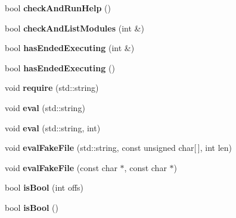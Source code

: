\begin{DoxyCompactItemize}
\item 
bool {\bfseries check\+And\+Run\+Help} ()\hypertarget{class_ice_tea_a8c9f95b6fcbc44b5e284d1d9686e74d7}{}\label{class_ice_tea_a8c9f95b6fcbc44b5e284d1d9686e74d7}

\item 
bool {\bfseries check\+And\+List\+Modules} (int \&)\hypertarget{class_ice_tea_aa48b4eb574e6f3ca9d21fc0c768c72b7}{}\label{class_ice_tea_aa48b4eb574e6f3ca9d21fc0c768c72b7}

\item 
bool {\bfseries has\+Ended\+Executing} (int \&)\hypertarget{class_ice_tea_a70d45477cad3081fb170740420e4f39c}{}\label{class_ice_tea_a70d45477cad3081fb170740420e4f39c}

\item 
bool {\bfseries has\+Ended\+Executing} ()\hypertarget{class_ice_tea_a4dc088d15d98924c132af9bba3c33101}{}\label{class_ice_tea_a4dc088d15d98924c132af9bba3c33101}

\item 
void {\bfseries require} (std\+::string)\hypertarget{class_ice_tea_a5b8cc8e876017e74fb721c55ca5d2179}{}\label{class_ice_tea_a5b8cc8e876017e74fb721c55ca5d2179}

\item 
void {\bfseries eval} (std\+::string)\hypertarget{class_ice_tea_a7f2594854e6110af44a1fa36335ae340}{}\label{class_ice_tea_a7f2594854e6110af44a1fa36335ae340}

\item 
void {\bfseries eval} (std\+::string, int)\hypertarget{class_ice_tea_ab11c20fe80d3cff0a4b96c2f10d20f28}{}\label{class_ice_tea_ab11c20fe80d3cff0a4b96c2f10d20f28}

\item 
void {\bfseries eval\+Fake\+File} (std\+::string, const unsigned char\mbox{[}$\,$\mbox{]}, int len)\hypertarget{class_ice_tea_a227da36c5c8de45b19d430c8d2126f02}{}\label{class_ice_tea_a227da36c5c8de45b19d430c8d2126f02}

\item 
void {\bfseries eval\+Fake\+File} (const char $\ast$, const char $\ast$)\hypertarget{class_ice_tea_a289840c34e37295ae8f454e9e41bca8b}{}\label{class_ice_tea_a289840c34e37295ae8f454e9e41bca8b}

\item 
bool {\bfseries is\+Bool} (int offs)\hypertarget{class_ice_tea_ae9c945c31f97e950fb94de9924d75a11}{}\label{class_ice_tea_ae9c945c31f97e950fb94de9924d75a11}

\item 
bool {\bfseries is\+Bool} ()\hypertarget{class_ice_tea_a8f6ec4439a2d4559012cc3d1893a2a56}{}\label{class_ice_tea_a8f6ec4439a2d4559012cc3d1893a2a56}


\end{DoxyCompactItemize}
